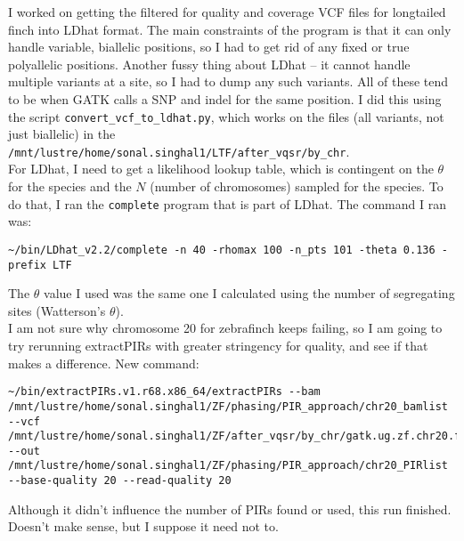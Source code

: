 \documentclass[idxtotoc,hyperref,openany,oneside]{labbook} %
\begin{document}
I worked on getting the filtered for quality and coverage VCF files for longtailed finch into LDhat format. The main constraints of the program is that it can only handle variable, biallelic positions, so I had to get rid of any fixed or true polyallelic positions. Another fussy thing about LDhat -- it cannot handle multiple variants at a site, so I had to dump any such variants. All of these tend to be when GATK calls a SNP and indel for the same position. I did this using the script \texttt{convert\_vcf\_to\_ldhat.py}, which works on the files (all variants, not just biallelic) in the \texttt{/mnt/lustre/home/sonal.singhal1/LTF/after\_vqsr/by\_chr}. \\

For LDhat, I need to get a likelihood lookup table, which is contingent on the $\theta$ for the species and the $N$ (number of chromosomes) sampled for the species. To do that, I ran the \verb+complete+ program that is part of LDhat. The command I ran was: 
\begin{verbatim}
~/bin/LDhat_v2.2/complete -n 40 -rhomax 100 -n_pts 101 -theta 0.136 -prefix LTF
\end{verbatim}
The $\theta$ value I used was the same one I calculated using the number of segregating sites (Watterson's $\theta$). \\

I am not sure why chromosome 20 for zebrafinch keeps failing, so I am going to try rerunning extractPIRs with greater stringency for quality, and see if that makes a difference. New command:
\begin{verbatim}
~/bin/extractPIRs.v1.r68.x86_64/extractPIRs --bam /mnt/lustre/home/sonal.singhal1/ZF/phasing/PIR_approach/chr20_bamlist --vcf /mnt/lustre/home/sonal.singhal1/ZF/after_vqsr/by_chr/gatk.ug.zf.chr20.filtered.coverage.biallelicSNPs.vqsr.vcf.gz --out /mnt/lustre/home/sonal.singhal1/ZF/phasing/PIR_approach/chr20_PIRlist --base-quality 20 --read-quality 20
\end{verbatim}
Although it didn't influence the number of PIRs found or used, this run finished. Doesn't make sense, but I suppose it need not to.
\end{document}
